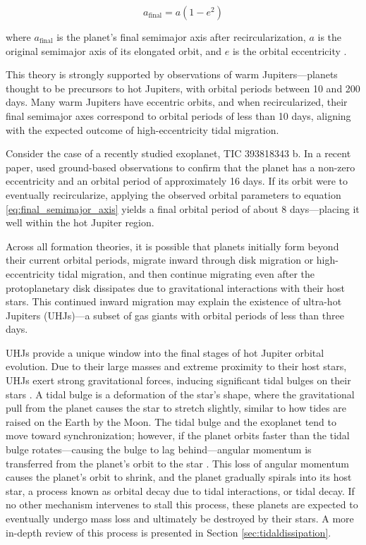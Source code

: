 \documentclass[oneside,12pt]{amsart}
\numberwithin{page}{section}
\begin{document}
\begin{equation}
    a_{\text{final}} = a(1 - e^2)
    \label{eq:final_semimajor_axis}
\end{equation}

where $a_{\text{final}}$ is the planet’s final semimajor axis after recircularization, $a$ is the original semimajor axis of its elongated orbit, and $e$ is the orbital eccentricity \citep{dawson2018origins}.

This theory is strongly supported by observations of warm Jupiters—planets thought to be precursors to hot Jupiters, with orbital periods between 10 and 200 days. Many warm Jupiters have eccentric orbits, and when recircularized, their final semimajor axes correspond to orbital periods of less than 10 days, aligning with the expected outcome of high-eccentricity tidal migration.

Consider the case of a recently studied exoplanet, TIC 393818343 b. In a recent paper, \citet{sgro2024confirmation} used ground-based observations to confirm that the planet has a non-zero eccentricity and an orbital period of approximately 16 days. If its orbit were to eventually recircularize, applying the observed orbital parameters to equation \ref{eq:final_semimajor_axis} yields a final orbital period of about 8 days—placing it well within the hot Jupiter region.

Across all formation theories, it is possible that planets initially form beyond their current orbital periods, migrate inward through disk migration or high-eccentricity tidal migration, and then continue migrating even after the protoplanetary disk dissipates due to gravitational interactions with their host stars. This continued inward migration may explain the existence of ultra-hot Jupiters (UHJs)—a subset of gas giants with orbital periods of less than three days.

UHJs provide a unique window into the final stages of hot Jupiter orbital evolution. Due to their large masses and extreme proximity to their host stars, UHJs exert strong gravitational forces, inducing significant tidal bulges on their stars \citep{jackson2023metrics}. A tidal bulge is a deformation of the star's shape, where the gravitational pull from the planet causes the star to stretch slightly, similar to how tides are raised on the Earth by the Moon. The tidal bulge and the exoplanet tend to move toward synchronization; however, if the planet orbits faster than the tidal bulge rotates—causing the bulge to lag behind—angular momentum is transferred from the planet’s orbit to the star \citep{ogilvie2014tidal}. This loss of angular momentum causes the planet's orbit to shrink, and the planet gradually spirals into its host star, a process known as orbital decay due to tidal interactions, or tidal decay. If no other mechanism intervenes to stall this process, these planets are expected to eventually undergo mass loss and ultimately be destroyed by their stars. A more in-depth review of this process is presented in Section \ref{sec:tidaldissipation}.
\end{document}
